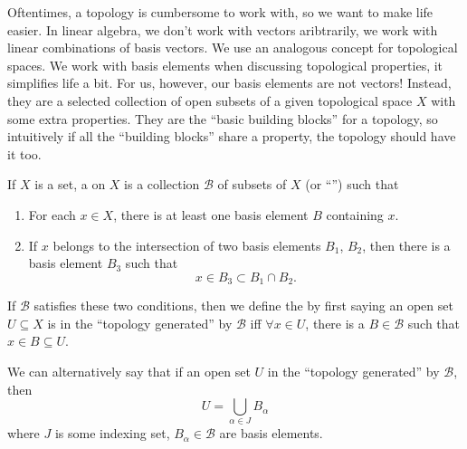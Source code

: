 \begin{prob}
Oftentimes, a topology is cumbersome to work with, so we want to
make life easier. In linear algebra, we don't work with vectors
aribtrarily, we work with linear combinations of basis
vectors. We use an analogous concept for topological spaces. We
work with basis elements when discussing topological properties,
it simplifies life a bit. For us, however, our basis elements are
not vectors! Instead, they are a selected collection of open
subsets of a given topological space $X$ with some extra
properties. They are the ``basic building blocks'' for a
topology, so intuitively if all the ``building blocks'' share a
property, the topology should have it too.
\end{prob}
\begin{defn}\label{defn:basisForTopology}
  If $X$ is a set, a  on $X$ is a
  collection $\mathscr{B}$ of subsets of $X$ (or ``'') 
  such that 
\begin{enumerate}
\item For each $x\in X$, there is at least one basis element $B$
  containing $x$.
\item If $x$ belongs to the intersection of two basis elements
  $B_{1}$, $B_{2}$, then there is a basis element $B_{3}$ such
  that
\begin{equation}
x\in B_{3}\subset B_{1}\cap B_{2}.
\end{equation}
\end{enumerate}
If $\mathscr{B}$ satisfies these two conditions, then we define
the  by
first saying an open set $U\subseteq X$ is in the ``topology generated'' by
$\mathscr{B}$ iff $\forall x\in U$, there is a $B\in\mathscr{B}$
such that $x\in B\subseteq U$.
\end{defn}
\begin{rmk}\label{rmk:topologyGenerated}
We can alternatively say that if an open set $U$ in the ``topology
generated'' by $\mathscr{B}$, then
\begin{equation}
U = \bigcup_{\alpha\in J}B_{\alpha}
\end{equation}
where $J$ is some indexing set, $B_{\alpha}\in\mathscr{B}$ are
basis elements.
\end{rmk}
